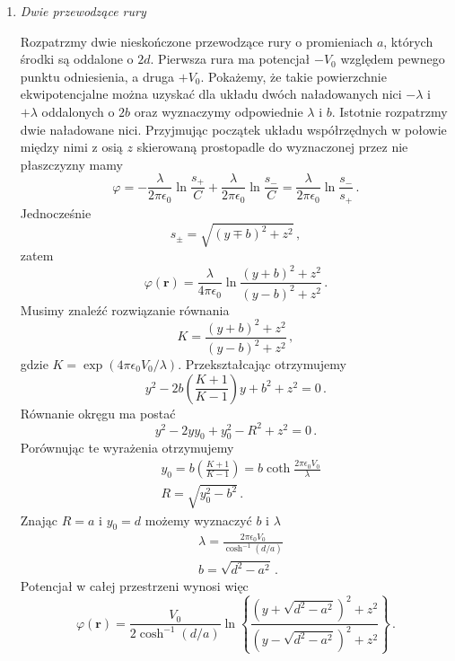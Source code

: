 \documentclass[../main.tex]{subfiles}
\begin{document}
\begin{enumerate}
    \item\textit{Dwie przewodzące rury}
    \medskip
    
    Rozpatrzmy dwie nieskończone przewodzące rury o promieniach \(a\), których środki są oddalone o
    \(2d\). Pierwsza rura ma potencjał \(-V_0\) względem pewnego punktu odniesienia, a druga
    \(+V_0\). Pokażemy, że takie powierzchnie ekwipotencjalne można uzyskać dla układu dwóch
    naładowanych nici \(-\lambda\) i \(+\lambda\) oddalonych o \(2b\) oraz wyznaczymy odpowiednie
    \(\lambda\) i \(b\). Istotnie rozpatrzmy dwie naładowane nici. Przyjmując początek układu
    współrzędnych w połowie między nimi z osią \(z\) skierowaną prostopadle do wyznaczonej przez nie
    płaszczyzny mamy
    \begin{equation*}
        \varphi=-\frac{\lambda}{2\pi\epsilon_0}\ln\frac{s_+}{C}+\frac{\lambda}{2\pi\epsilon_0}\ln\frac{s_-}{C}=\frac{\lambda}{2\pi\epsilon_0}\ln\frac{s_-}{s_+}\,.
    \end{equation*}
    Jednocześnie
    \begin{equation*}
        s_\pm=\sqrt{(y\mp b)^2+z^2}\,,
    \end{equation*}
    zatem
    \begin{equation*}
        \varphi(\mathbf{r})=\frac{\lambda}{4\pi\epsilon_0}\ln\frac{(y+b)^2+z^2}{(y-b)^2+z^2}\,.
    \end{equation*}
    Musimy znaleźć rozwiązanie równania
    \begin{equation*}
        K=\frac{(y+b)^2+z^2}{(y-b)^2+z^2}\,,
    \end{equation*}
    gdzie \(K=\exp(4\pi\epsilon_0V_0/\lambda)\). Przekształcając otrzymujemy
    \begin{equation*}
        y^2-2b\left(\frac{K+1}{K-1}\right)y+b^2+z^2=0\,.
    \end{equation*}
    Równanie okręgu ma postać
    \begin{equation*}
        y^2-2yy_0+y_0^2-R^2+z^2=0\,.
    \end{equation*}
    Porównując te wyrażenia otrzymujemy
    \begin{equation*}
        \begin{split}
            &y_0=b\left(\frac{K+1}{K-1}\right)=b\coth\frac{2\pi\epsilon_0V_0}{\lambda}\\
            &R=\sqrt{y_0^2-b^2}\,.
        \end{split}
    \end{equation*}
    Znając \(R=a\) i \(y_0=d\) możemy wyznaczyć \(b\) i \(\lambda\)
    \begin{equation*}
    \begin{split}
        &\lambda=\frac{2\pi\epsilon_0V_0}{\cosh^{-1}{(d/a)}}\\
        &b=\sqrt{d^2-a^2}\,.
    \end{split}
    \end{equation*}
    Potencjał w całej przestrzeni wynosi więc
    \begin{equation*}
        \varphi(\mathbf{r})=\frac{V_0}{2\cosh^{-1}(d/a)}\ln\left\{\frac{(y+\sqrt{d^2-a^2})^2+z^2}{(y-\sqrt{d^2-a^2})^2+z^2}\right\}\,.
    \end{equation*}
    

\end{enumerate}
\end{document}

